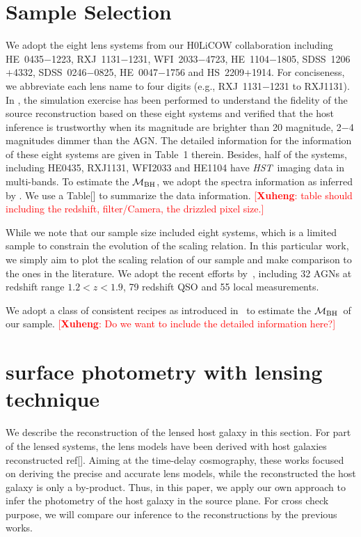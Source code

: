 \documentclass[fleqn,usenatbib]{mnras}
\newcommand{\hst}{{\it HST}}
\newcommand{\mbh}{$\mathcal M_{\rm BH}$}
\newcommand{\ding}[1]{\textcolor{red}{[{\bf Xuheng}: #1]}}
\begin{document}
\section{Sample Selection}
We adopt the eight lens systems from our H0LiCOW collaboration including HE~0435$-$1223, RXJ~1131$-$1231, WFI~2033$-$4723, HE~1104$-$1805, SDSS~1206$+$4332, SDSS~0246$-$0825, HE~0047$-$1756 and HS~2209$+$1914. For conciseness, we abbreviate each lens name to four digits (e.g., RXJ~1131$-$1231 to RXJ1131). In \citet{Ding2017a}, the simulation exercise has been performed to understand the fidelity of the source reconstruction based on these eight systems and verified that the host inference is trustworthy when its magnitude are brighter than 20 magnitude, 2$-$4 magnitudes dimmer than the AGN. The detailed information for the information of these eight systems are given in Table~1 therein. Besides, half of the systems, including HE0435, RXJ1131, WFI2033 and HE1104 have \hst\ imaging data in multi-bands. To estimate the \mbh, we adopt the spectra information as inferred by \citet{Sluse2012, Peng2006, Shen2011}. We use a Table[] to summarize the data information. \ding{table should including the redshift, filter/Camera, the drizzled pixel size.}

While we note that our sample size included eight systems, which is a limited sample to constrain the evolution of the scaling relation. In this particular work, we simply aim to plot the scaling relation of our sample and make comparison to the ones in the literature. %
We adopt the recent efforts by~\citet{Ding2020}, including 32 AGNs at redshift range $1.2<z<1.9$, 79 redshift QSO and 55 local measurements.

We adopt a class of consistent recipes as introduced in~\citet{Ding2020} to estimate the \mbh\ of our sample. \ding{Do we want to include the detailed information here?}

\section{surface photometry with lensing technique}
We describe the reconstruction of the lensed host galaxy in this section. For part of the lensed systems, the lens models have been derived with host galaxies reconstructed ref[]. Aiming at the time-delay cosmography, these works focused on deriving the precise and accurate lens models, while the reconstructed the host galaxy is only a by-product. Thus, in this paper, we apply our own approach to infer the photometry of the host galaxy in the source plane. For cross check purpose, we will compare our inference to the reconstructions by the previous works.
\end{document}
